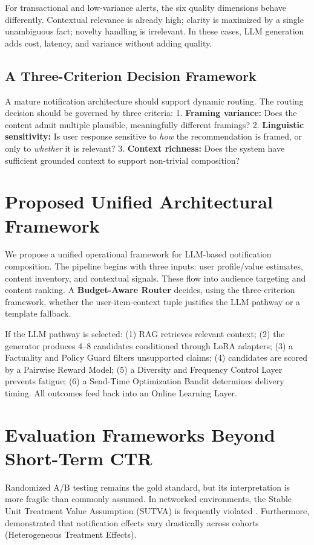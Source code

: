 \documentclass[11pt]{article}
\begin{document}
For transactional and low-variance alerts, the six quality dimensions behave differently. Contextual relevance is already high; clarity is maximized by a single unambiguous fact; novelty handling is irrelevant. In these cases, LLM generation adds cost, latency, and variance without adding quality.

\subsection{A Three-Criterion Decision Framework}

A mature notification architecture should support dynamic routing. The routing decision should be governed by three criteria:
1. \textbf{Framing variance:} Does the content admit multiple plausible, meaningfully different framings?
2. \textbf{Linguistic sensitivity:} Is user response sensitive to \textit{how} the recommendation is framed, or only to \textit{whether} it is relevant?
3. \textbf{Context richness:} Does the system have sufficient grounded context to support non-trivial composition?

\section{Proposed Unified Architectural Framework}

We propose a unified operational framework for LLM-based notification composition. The pipeline begins with three inputs: user profile/value estimates, content inventory, and contextual signals. These flow into audience targeting and content ranking. A \textbf{Budget-Aware Router} decides, using the three-criterion framework, whether the user-item-context tuple justifies the LLM pathway or a template fallback.

If the LLM pathway is selected: (1) RAG retrieves relevant context; (2) the generator produces 4--8 candidates conditioned through LoRA adapters; (3) a Factuality and Policy Guard filters unsupported claims; (4) candidates are scored by a Pairwise Reward Model; (5) a Diversity and Frequency Control Layer prevents fatigue; (6) a Send-Time Optimization Bandit determines delivery timing. All outcomes feed back into an Online Learning Layer.

\section{Evaluation Frameworks Beyond Short-Term CTR}

Randomized A/B testing remains the gold standard, but its interpretation is more fragile than commonly assumed. In networked environments, the Stable Unit Treatment Value Assumption (SUTVA) is frequently violated \citep{luo2024survey}. Furthermore, \citet{tu2021personalized} demonstrated that notification effects vary drastically across cohorts (Heterogeneous Treatment Effects).
\end{document}
